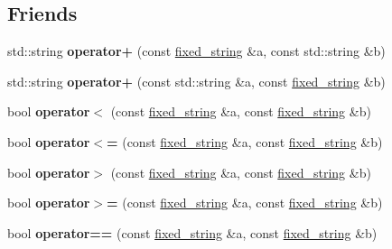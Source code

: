 \subsection*{Friends}
\begin{DoxyCompactItemize}
\item 
\mbox{\label{classfc_1_1fixed__string_acbdef2e61dcf8a31e977724889c5fd2c}} 
std\+::string {\bfseries operator+} (const \mbox{\hyperlink{classfc_1_1fixed__string}{fixed\+\_\+string}} \&a, const std\+::string \&b)
\item 
\mbox{\label{classfc_1_1fixed__string_a9c58a08204a8cb0cc2b7ee3ec05bc278}} 
std\+::string {\bfseries operator+} (const std\+::string \&a, const \mbox{\hyperlink{classfc_1_1fixed__string}{fixed\+\_\+string}} \&b)
\item 
\mbox{\label{classfc_1_1fixed__string_a3a91d7ccc7b6c29550ece26ed56d6e34}} 
bool {\bfseries operator$<$} (const \mbox{\hyperlink{classfc_1_1fixed__string}{fixed\+\_\+string}} \&a, const \mbox{\hyperlink{classfc_1_1fixed__string}{fixed\+\_\+string}} \&b)
\item 
\mbox{\label{classfc_1_1fixed__string_aa54bd6e5208463d8f28b309bb7db6a65}} 
bool {\bfseries operator$<$=} (const \mbox{\hyperlink{classfc_1_1fixed__string}{fixed\+\_\+string}} \&a, const \mbox{\hyperlink{classfc_1_1fixed__string}{fixed\+\_\+string}} \&b)
\item 
\mbox{\label{classfc_1_1fixed__string_a2055d7eca7645187c8a22c6090d5d23b}} 
bool {\bfseries operator$>$} (const \mbox{\hyperlink{classfc_1_1fixed__string}{fixed\+\_\+string}} \&a, const \mbox{\hyperlink{classfc_1_1fixed__string}{fixed\+\_\+string}} \&b)
\item 
\mbox{\label{classfc_1_1fixed__string_ad5f887b7ae8b3b5a38187b867e0c6f81}} 
bool {\bfseries operator$>$=} (const \mbox{\hyperlink{classfc_1_1fixed__string}{fixed\+\_\+string}} \&a, const \mbox{\hyperlink{classfc_1_1fixed__string}{fixed\+\_\+string}} \&b)
\item 
\mbox{\label{classfc_1_1fixed__string_a9b998276387f6d7603ee8040c172d7ca}} 
bool {\bfseries operator==} (const \mbox{\hyperlink{classfc_1_1fixed__string}{fixed\+\_\+string}} \&a, const \mbox{\hyperlink{classfc_1_1fixed__string}{fixed\+\_\+string}} \&b)

\end{DoxyCompactItemize}
